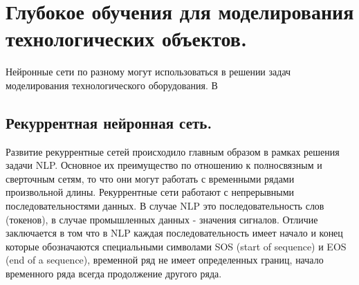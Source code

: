 \documentclass[12pt,a4paper]{article}
\begin{document}
\section{Глубокое обучения для моделирования технологических объектов.}

Нейронные сети по разному могут использоваться в решении задач моделирования технологического оборудования. В \cite{Shabunin}

\subsection{Рекуррентная нейронная сеть.}


Развитие рекуррентные сетей происходило главным образом в рамках решения задачи NLP. Основное их преимущество по отношению к полносвязным и сверточным сетям, то что они могут работать с временными рядами произвольной длины. Рекуррентные сети работают с непрерывными последовательностями данных. В случае NLP это  последовательность слов (токенов), в случае промышленных данных - значения сигналов. Отличие заключается в том что в NLP каждая последовательность имеет начало и конец которые обозначаются специальными символами SOS (start of sequence) и EOS (end of a sequence), временной ряд не имеет определенных границ, начало временного ряда всегда продолжение другого ряда.

%
\end{document}
